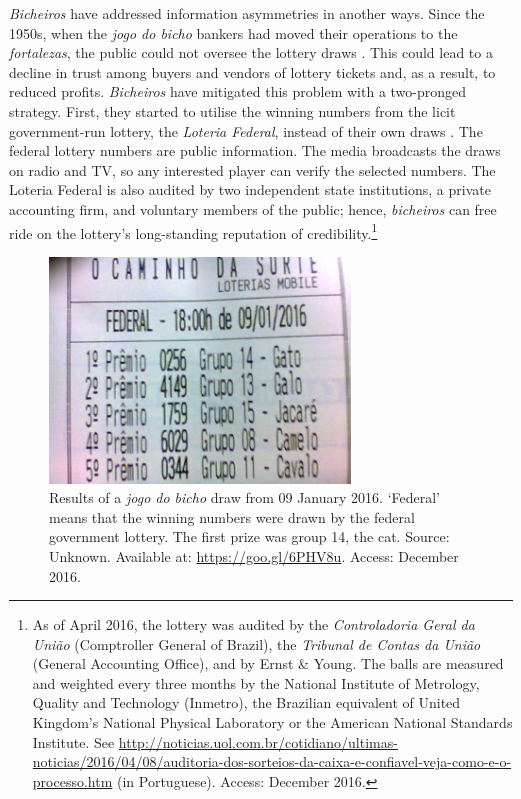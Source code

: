 \emph{Bicheiros} have addressed information asymmetries in another ways. Since the 1950s, when the \emph{jogo do bicho} bankers had moved their operations to the \emph{fortalezas}, the public could not oversee the lottery draws \citep[259]{chazkel2011laws}. This could lead to a decline in trust among buyers and vendors of lottery tickets and, as a result, to reduced profits. \emph{Bicheiros} have mitigated this problem with a two-pronged strategy. First, they started to utilise the winning numbers from the licit government-run lottery, the \emph{Loteria Federal}, instead of their own draws \citetext{\citealp[546]{chazkel2007beyond}; \citealp[89]{labronici2012paratodos}; \citealp[39-40]{mello1989historia}}. The federal lottery numbers are public information. The media broadcasts the draws on radio and TV, so any interested player can verify the selected numbers. The Loteria Federal is also audited by two independent state institutions, a private accounting firm, and voluntary members of the public; hence, \emph{bicheiros} can free ride on the lottery's long-standing reputation of credibility.\footnote{As of April 2016, the lottery was audited by the \emph{Controladoria Geral da União} (Comptroller General of Brazil), the \emph{Tribunal de Contas da União} (General Accounting Office), and by Ernst \& Young. The balls are measured and weighted every three months by the National Institute of Metrology, Quality and Technology (Inmetro), the Brazilian equivalent of United Kingdom's National Physical Laboratory or the American National Standards Institute. See \url{http://noticias.uol.com.br/cotidiano/ultimas-noticias/2016/04/08/auditoria-dos-sorteios-da-caixa-e-confiavel-veja-como-e-o-processo.htm} (in Portuguese). Access: December 2016.}

\begin{figure}[!htbp]
	\centering
	\includegraphics[width=\textwidth, height=6cm]{images/bicho06.jpg}
	\caption{Results of a \emph{jogo do bicho} draw from 09 January 2016. `Federal' means that the winning numbers were drawn by the federal government lottery. The first prize was group 14, the cat. Source: Unknown. Available at: \url{https://goo.gl/6PHV8u}. Access: December 2016.}
	\label{fig:federal}
\end{figure}


